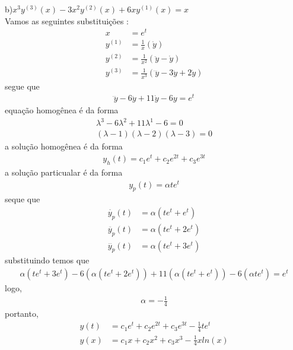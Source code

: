 \documentclass[a4paper,12pt]{article}
\begin{document}
b)$x^{3}y^{(3)}(x) - 3x^{2}y^{(2)}(x) + 6xy^{(1)}(x) = x$\\
Vamos as seguintes substitui\c c\~oes :
\begin{align*}
	x &= e^{t} \\
	y^{(1)} &= \frac{1}{x} (\dot y) \\
	y^{(2)} &= \frac{1}{x^{2}} (\ddot y - \dot y) \\
	y^{(3)} &= \frac{1}{x^{3}} ( \dddot y -3 \ddot y +2 \dot y)
\end{align*}
segue que 
\begin{align*}
	\dddot y - 6 \ddot y + 11\dot y - 6 y = e^{t}
\end{align*}
equa\c c\~ao homog\^enea \'e da forma
\begin{align*}
	{\lambda}^{3} -6{\lambda}^{2} + 11{\lambda}^{1} - 6 = 0\\
	{(\lambda - 1)}{(\lambda - 2)} {(\lambda - 3)} = 0
\end{align*}
a solu\c c\~ao homog\^enea \'e da forma 
\begin{align*}
	y_h (t) = c_1 e^{t} + c_2 e^{2t} + c_3 e^{3t}
\end{align*}
a solu\c c\~ao particualar \'e da forma 
\begin{align*}
	y_p(t) = {\alpha}t e^{t}
\end{align*}
seque que 
\begin{align*}
	\dot {y_p} (t) &= {\alpha}(t e^{t} + e^{t}) \\
	\ddot {y_p} (t) &= {\alpha}(t e^{t} + 2e^{t}) \\
	\dddot {y_p} (t) &= {\alpha}(t e^{t} + 3e^{t}) 
\end{align*}
substituindo temos que 
\begin{align*}
	{\alpha}(t e^{t} + 3e^{t}) - 6({\alpha}(t e^{t} + 2e^{t})) + 11({\alpha}(t e^{t} + e^{t}))  - 6 ({\alpha}t e^{t}
	) = e^{t} 
\end{align*}
logo,
\begin{align*}
	{\alpha} = -\frac{1}{4}
\end{align*}
portanto,
\begin{align*}
	y(t) &= c_1 e^{t} + c_2 e^{2t} + c_3 e^{3t} -\frac{1}{4}
 t e^{t} \\
 y(x) &= c_1 x + c_2 x^{2} + c_3 x^{3} -\frac{1}{4}xln(x)
\end{align*}
\end{document}
